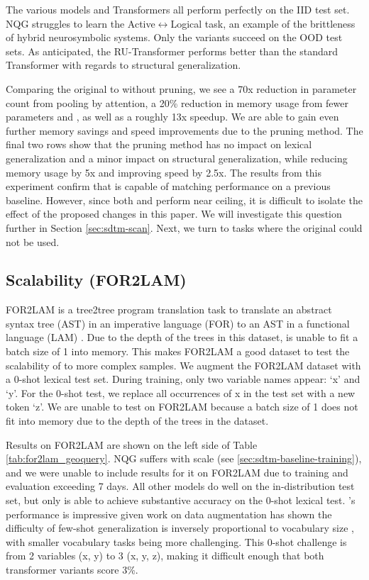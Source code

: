 The various \dtm models and Transformers all perform perfectly on the IID test set. NQG struggles to learn the Active$\leftrightarrow$Logical task, an example of the brittleness of hybrid neurosymbolic systems. Only the \dtm variants succeed on the OOD test sets. As anticipated, the RU-Transformer performs better than the standard Transformer with regards to structural generalization.

Comparing the original \dtm to \sdtm without pruning, we see a 70x reduction in parameter count from pooling by attention, a 20\% reduction in memory usage from fewer parameters and \abvrepname, as well as a roughly 13x speedup. We are able to gain even further memory savings and speed improvements due to the pruning method. The final two rows show that the pruning method has no impact on lexical generalization and a minor impact on structural generalization, while reducing memory usage by 5x and improving speed by 2.5x. The results from this experiment confirm that \sdtm is capable of matching \dtm performance on a previous baseline. However, since both \dtm and \sdtm perform near ceiling, it is difficult to isolate the effect of the proposed changes in this paper. We will investigate this question further in Section \ref{sec:sdtm-scan}. Next, we turn to tasks where the original \dtm could not be used.

\subsection{Scalability (FOR2LAM)}
FOR2LAM is a tree2tree program translation task to translate an abstract syntax tree (AST) in an imperative language (FOR) to an AST in a functional language (LAM) \citep{NEURIPS2018_d759175d}. Due to the depth of the trees in this dataset, \dtm is unable to fit a batch size of 1 into memory. This makes FOR2LAM a good dataset to test the scalability of \sdtm to more complex samples. We augment the FOR2LAM dataset with a 0-shot lexical test set. During training, only two variable names appear: `x' and `y'. For the 0-shot test, we replace all occurrences of x in the test set with a new token `z'. We are unable to test \dtm on FOR2LAM because a batch size of 1 does not fit into memory due to the depth of the trees in the dataset.


Results on FOR2LAM are shown on the left side of Table \ref{tab:for2lam_geoquery}. NQG suffers with scale (see \ref{sec:sdtm-baseline-training}), and we were unable to include results for it on FOR2LAM due to training and evaluation exceeding 7 days. All other models do well on the in-distribution test set, but only \dtm is able to achieve substantive accuracy on the 0-shot lexical test. \dtm's performance is impressive given work on data augmentation has shown the difficulty of few-shot generalization is inversely proportional to vocabulary size \citep{patel2022revisiting}, with smaller vocabulary tasks being more challenging. This 0-shot challenge is from 2 variables (x, y) to 3 (x, y, z), making it difficult enough that both transformer variants score 3\%.

